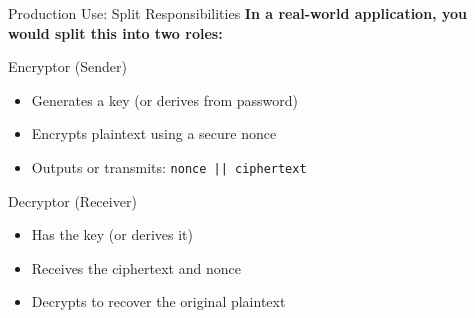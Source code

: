 \documentclass{beamer}
\begin{document}
	\begin{frame}[t]{Production Use: Split Responsibilities}
		\textbf{In a real-world application, you would split this into two roles:}
		\vspace{0.5em}
		\begin{block}{Encryptor (Sender)}
			\begin{itemize}
				\item Generates a key (or derives from password)
				\item Encrypts plaintext using a secure nonce
				\item Outputs or transmits: \texttt{nonce || ciphertext}
			\end{itemize}
		\end{block}
		\begin{block}{Decryptor (Receiver)}
			\begin{itemize}
				\item Has the key (or derives it)
				\item Receives the ciphertext and nonce
				\item Decrypts to recover the original plaintext
			\end{itemize}
		\end{block}
	\end{frame}
\end{document}

